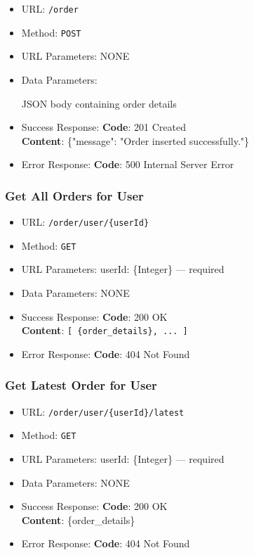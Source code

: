 \begin{itemize}
    \item URL: \texttt{/order}
    \item Method: \texttt{POST}
    \item URL Parameters: NONE
    \item Data Parameters:

    JSON body containing order details

    \item Success Response: \newline
    \textbf{Code}: 201 Created \\
    \textbf{Content}: \{"message": "Order inserted successfully."\}

    \item Error Response: \newline
    \textbf{Code}: 500 Internal Server Error
\end{itemize}

\subsubsection*{Get All Orders for User}

\begin{itemize}
    \item URL: \texttt{/order/user/\{userId\}}
    \item Method: \texttt{GET}
    \item URL Parameters: userId: \{Integer\} — required
    \item Data Parameters: NONE

    \item Success Response: \newline
    \textbf{Code}: 200 OK \\
    \textbf{Content}: \texttt{[ \{order\_details\}, ... ]}

    \item Error Response: \newline
    \textbf{Code}: 404 Not Found
\end{itemize}

\subsubsection*{Get Latest Order for User}

\begin{itemize}
    \item URL: \texttt{/order/user/\{userId\}/latest}
    \item Method: \texttt{GET}
    \item URL Parameters: userId: \{Integer\} — required
    \item Data Parameters: NONE

    \item Success Response: \newline
    \textbf{Code}: 200 OK \\
    \textbf{Content}: \{order\_details\}

    \item Error Response: \newline
    \textbf{Code}: 404 Not Found
\end{itemize}

